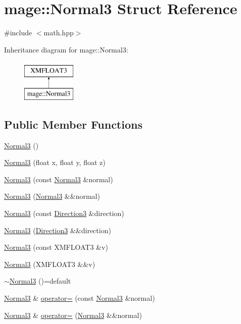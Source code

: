 \hypertarget{structmage_1_1_normal3}{}\section{mage\+:\+:Normal3 Struct Reference}
\label{structmage_1_1_normal3}


{\ttfamily \#include $<$math.\+hpp$>$}

Inheritance diagram for mage\+:\+:Normal3\+:\begin{figure}[H]
\begin{center}
\leavevmode
\includegraphics[height=2.000000cm]{structmage_1_1_normal3}
\end{center}
\end{figure}
\subsection*{Public Member Functions}
\begin{DoxyCompactItemize}
\item 
\hyperlink{structmage_1_1_normal3_a66ec99f0de4f8231f747e37a4da65cc4}{Normal3} ()
\item 
\hyperlink{structmage_1_1_normal3_a59094c1f96a9721cd8846c5c6ec06f93}{Normal3} (float x, float y, float z)
\item 
\hyperlink{structmage_1_1_normal3_ada9c762e16b51177f3fc1aa6d5310b20}{Normal3} (const \hyperlink{structmage_1_1_normal3}{Normal3} \&normal)
\item 
\hyperlink{structmage_1_1_normal3_ab230659472ea5048c881beb5168e0ad3}{Normal3} (\hyperlink{structmage_1_1_normal3}{Normal3} \&\&normal)
\item 
\hyperlink{structmage_1_1_normal3_a0942e7aace8354f0a414f77ccf90b69c}{Normal3} (const \hyperlink{structmage_1_1_direction3}{Direction3} \&direction)
\item 
\hyperlink{structmage_1_1_normal3_a3799d741c08159f26f5ae13b2df98c56}{Normal3} (\hyperlink{structmage_1_1_direction3}{Direction3} \&\&direction)
\item 
\hyperlink{structmage_1_1_normal3_a0e3fc791c0cfd01299cd81d3e147bf52}{Normal3} (const X\+M\+F\+L\+O\+A\+T3 \&v)
\item 
\hyperlink{structmage_1_1_normal3_ab27f7057de8d66d947bb24ed1c14532b}{Normal3} (X\+M\+F\+L\+O\+A\+T3 \&\&v)
\item 
\hyperlink{structmage_1_1_normal3_a3384b2970fd85fe729514ce0686b4446}{$\sim$\+Normal3} ()=default
\item 
\hyperlink{structmage_1_1_normal3}{Normal3} \& \hyperlink{structmage_1_1_normal3_ade86357989ceaecf1b22bb9e53ca7fed}{operator=} (const \hyperlink{structmage_1_1_normal3}{Normal3} \&normal)
\item 
\hyperlink{structmage_1_1_normal3}{Normal3} \& \hyperlink{structmage_1_1_normal3_a74cd3988b2ee23a0a76a5f7d6d5d7f3f}{operator=} (\hyperlink{structmage_1_1_normal3}{Normal3} \&\&normal)
\end{DoxyCompactItemize}


